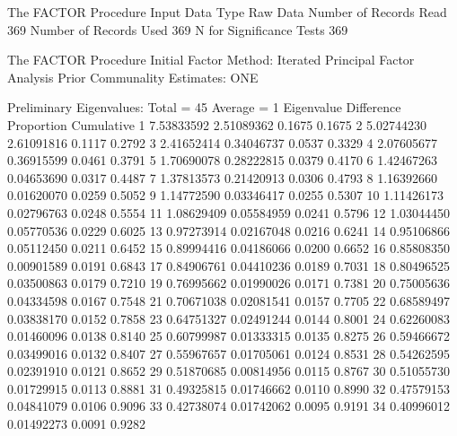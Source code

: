 \documentclass{article}
\begin{document}
\begin{Woutput}
The FACTOR Procedure
Input Data Type                    Raw Data
Number of Records Read                  369
Number of Records Used                  369
N for Significance Tests                369

The FACTOR Procedure
Initial Factor Method: Iterated Principal Factor Analysis
Prior Communality Estimates: ONE

      Preliminary Eigenvalues: Total = 45  Average = 1
        Eigenvalue    Difference    Proportion    Cumulative
   1    7.53833592    2.51089362        0.1675        0.1675
   2    5.02744230    2.61091816        0.1117        0.2792
   3    2.41652414    0.34046737        0.0537        0.3329
   4    2.07605677    0.36915599        0.0461        0.3791
   5    1.70690078    0.28222815        0.0379        0.4170
   6    1.42467263    0.04653690        0.0317        0.4487
   7    1.37813573    0.21420913        0.0306        0.4793
   8    1.16392660    0.01620070        0.0259        0.5052
   9    1.14772590    0.03346417        0.0255        0.5307
  10    1.11426173    0.02796763        0.0248        0.5554
  11    1.08629409    0.05584959        0.0241        0.5796
  12    1.03044450    0.05770536        0.0229        0.6025
  13    0.97273914    0.02167048        0.0216        0.6241
  14    0.95106866    0.05112450        0.0211        0.6452
  15    0.89994416    0.04186066        0.0200        0.6652
  16    0.85808350    0.00901589        0.0191        0.6843
  17    0.84906761    0.04410236        0.0189        0.7031
  18    0.80496525    0.03500863        0.0179        0.7210
  19    0.76995662    0.01990026        0.0171        0.7381
  20    0.75005636    0.04334598        0.0167        0.7548
  21    0.70671038    0.02081541        0.0157        0.7705
  22    0.68589497    0.03838170        0.0152        0.7858
  23    0.64751327    0.02491244        0.0144        0.8001
  24    0.62260083    0.01460096        0.0138        0.8140
  25    0.60799987    0.01333315        0.0135        0.8275
  26    0.59466672    0.03499016        0.0132        0.8407
  27    0.55967657    0.01705061        0.0124        0.8531
  28    0.54262595    0.02391910        0.0121        0.8652
  29    0.51870685    0.00814956        0.0115        0.8767
  30    0.51055730    0.01729915        0.0113        0.8881
  31    0.49325815    0.01746662        0.0110        0.8990
  32    0.47579153    0.04841079        0.0106        0.9096
  33    0.42738074    0.01742062        0.0095        0.9191
  34    0.40996012    0.01492273        0.0091        0.9282

\end{Woutput}
\end{document}

